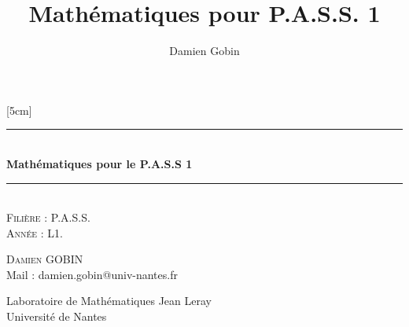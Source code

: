 \documentclass[a4paper, 11pt,openany]{book}%
\title{Mathématiques pour P.A.S.S. 1}
\author{Damien Gobin}
\newtheorem[L]{thm}{Théorème}[section]
\newtheorem[M]{propo}[thm]{Proposition}
\newtheorem[M]{prop}[thm]{Propriété}
\newtheorem[M]{coro}[thm]{Corollaire}
\newtheorem[M]{lem}[thm]{Lemme}
\newtheorem[M,bodystyle=]{defi}[thm]{Définition}
\newtheorem[M,bodystyle=]{remark}[thm]{Remarque}
\newtheorem[M,bodystyle=]{met}[thm]{Méthode}
\newtheorem[M,bodystyle=]{ret}[thm]{A retenir}
\newtheorem[M,bodystyle=]{idee}[thm]{Idée}
\newtheorem[style=S,underline=false,bodystyle=]{exem}[thm]{Exemple}
\newtheorem[S,underline=false,bodystyle=]{exo}[thm]{Exercice}
\newtheorem[S,underline=false,bodystyle=]{appli}[thm]{Application}
\newtheorem[S,underline=false,bodystyle=]{sol}[thm]{Solution}
\newtheorem[S,underline=false,bodystyle=]{hypo}[thm]{Hypothesis}
\newtheorem[S,underline=false,bodystyle=]{nota}[thm]{Notation}
\begin{document}
\begin{titlepage}
  \begin{sffamily}
  \begin{center}

 
    \hspace{5.7cm}

    [5cm]


    \rule{\linewidth}{0.5mm}\\[0.4cm]
    { \huge \bfseries Mathématiques pour le P.A.S.S 1\\[0.4cm] }

    \rule{\linewidth}{0.5mm}\\[4cm]
    

    \textsc{\Large Filière : P.A.S.S.}\\
    \textsc{\Large Année : L1.}\\    [5cm]
    
   
    \begin{minipage}{0.4\textwidth}
      \begin{flushleft} \large
        \textsc{Damien GOBIN}\\
        Mail : damien.gobin@univ-nantes.fr\\
      \end{flushleft}
    \end{minipage}
    \hspace{1cm}
    \begin{minipage}{0.5\textwidth}
      \begin{flushright} \large
         Laboratoire de Mathématiques Jean Leray \\
        Université de Nantes
      \end{flushright}
    \end{minipage}
    
    


\end{center}
\end{sffamily}
\end{titlepage}
\end{document}

